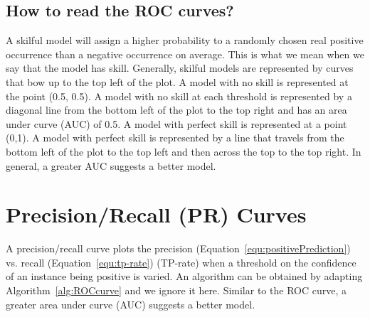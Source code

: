 \subsection*{How to read the ROC curves?}

A skilful model will assign a higher probability to a randomly chosen real positive occurrence than a negative occurrence on average. This is what we mean when we say that the model has skill. Generally, skilful models are represented by curves that bow up to the top left of the plot.
A model with no skill is represented at the point (0.5, 0.5). A model with no skill at each threshold is represented by a diagonal line from the bottom left of the plot to the top right and has an area under curve (AUC) of 0.5.
A model with perfect skill is represented at a point (0,1). A model with perfect skill is represented by a line that travels from the bottom left of the plot to the top left and then across the top to the top right. In general, a greater AUC suggests a better model. 

\section{Precision/Recall (PR) Curves}

A precision/recall curve plots the precision (Equation~\ref{equ:positivePrediction}) vs. recall (Equation~\ref{equ:tp-rate}) (TP-rate) when a threshold on the confidence of an instance being positive is varied. An algorithm can be obtained by adapting Algorithm~\ref{alg:ROCcurve} and we ignore it here. Similar to the ROC curve, a greater area under curve (AUC) suggests a better model. 